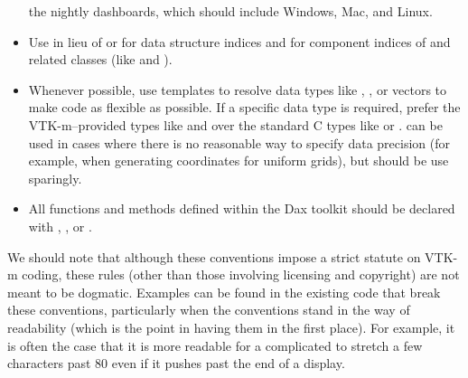 \begin{itemize}
  the nightly dashboards, which should include Windows, Mac, and Linux.
\item Use  in lieu of  or  for data
  structure indices and  for component indices of
   and related classes (like  and
  ).
\item Whenever possible, use templates to resolve data types like
  , , or vectors to make code as flexible
  as possible. If a specific data type is required, prefer the
  VTK-m--provided types like  and  over the
  standard C types like  or
  .  can be used in cases where there
  is no reasonable way to specify data precision (for example, when
  generating coordinates for uniform grids), but should be use sparingly.
\item All functions and methods defined within the Dax toolkit should be
  declared with \vtkmcontexport, \vtkmexecexport, or \vtkmexeccontexport.
\end{itemize}

We should note that although these conventions impose a strict statute on
VTK-m coding, these rules (other than those involving licensing and
copyright) are not meant to be dogmatic. Examples can be found in the
existing code that break these conventions, particularly when the
conventions stand in the way of readability (which is the point in having
them in the first place). For example, it is often the case that it is more
readable for a complicated  to stretch a few characters
past 80 even if it pushes past the end of a display.
